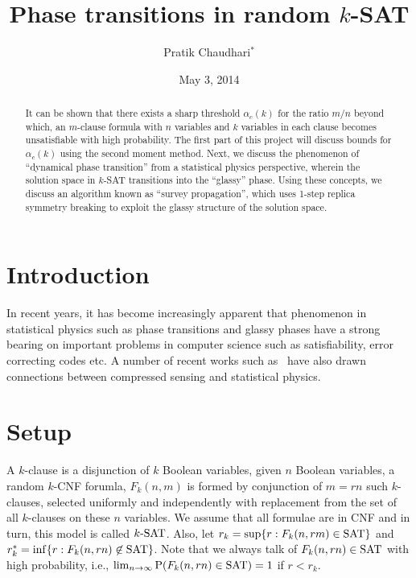 \documentclass[letterpaper, 10pt, twocolumn, reqno]{amsart}
\title{Phase transitions in random $k$-SAT}
\author{Pratik Chaudhari$^*$}
\date{May 3, 2014}
\begin{document}
\begin{abstract}
It can be shown that there exists a sharp threshold $\alpha_c(k)$ for the ratio $m/n$ beyond which, an $m$-clause formula with $n$ variables and $k$ variables in each clause becomes unsatisfiable with high probability. The first part of this project will discuss bounds for $\alpha_c(k)$ using the second moment method.
%
Next, we discuss the phenomenon of ``dynamical phase transition'' from a statistical physics perspective, wherein the solution space in $k$-SAT transitions into the ``glassy'' phase. Using these concepts, we discuss an algorithm known as ``survey propagation'', which uses 1-step replica symmetry breaking to exploit the glassy structure of the solution space.
\end{abstract}
\maketitle

\section{Introduction}
In recent years, it has become increasingly apparent that phenomenon in statistical physics such as phase transitions and glassy phases have a strong bearing on important problems in computer science such as satisfiability, error correcting codes etc. A number of recent works such as~\cite{krzakala2012statistical} have also drawn connections between compressed sensing and statistical physics.



\section{Setup}
\label{sec:setup}
A $k$-clause is a disjunction of $k$ Boolean variables, given $n$ Boolean
variables, a random $k$-CNF forumla, $F_k(n, m)$ is formed by conjunction of $m = rn$ such $k$-clauses, selected uniformly and independently with
replacement from the set of all $k$-clauses on these $n$ variables. We assume that all formulae are in CNF and in turn, this model is called $k\textrm{-SAT}$. Also,
let $r_k = \sup \{ r: F_k(n, rm) \in \textrm{SAT} \}$ and $r_k^* = \inf \{ r: F_k(n, rn) \not\in \textrm{SAT} \}$. Note that we always talk of $F_k(n,rn) \in \textrm{SAT}$ with high probability, i.e., $\lim_{n\to \infty} \textrm{P}(F_k(n,rn) \in \textrm{SAT}) = 1$ if $r < r_k$.
\end{document}
